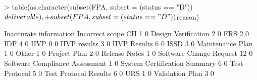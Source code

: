 \documentclass{article}
\begin{document}
\begin{Schunk}
\begin{Sinput}
> table(as.character(subset(FPA, subset = (status == "D"))$deliverable),
+       subset(FPA, subset = (status == "D"))$reason)
\end{Sinput}
\begin{Soutput}
                                 Inaccurate information Incorrect scope
  CII                                                 1               0
  Design Verification                                 2               0
  FRS                                                 2               0
  IDP                                                 4               0
  IIVP                                                0               0
  IIVP results                                        3               0
  IIVP Results                                        6               0
  ISSD                                                3               0
  Maintenance Plan                                    1               0
  Other                                               1               0
  Project Plan                                        2               0
  Release Notes                                       1               0
  Software Change Request                            12               0
  Software Compliance Assessment                      1               0
  System Certification Summary                        6               0
  Test Protocol                                       5               0
  Test Protocol Results                               6               0
  URS                                                 1               0
  Validation Plan                                     3               0
                                

\end{Soutput}
\end{Schunk}
\end{document}
